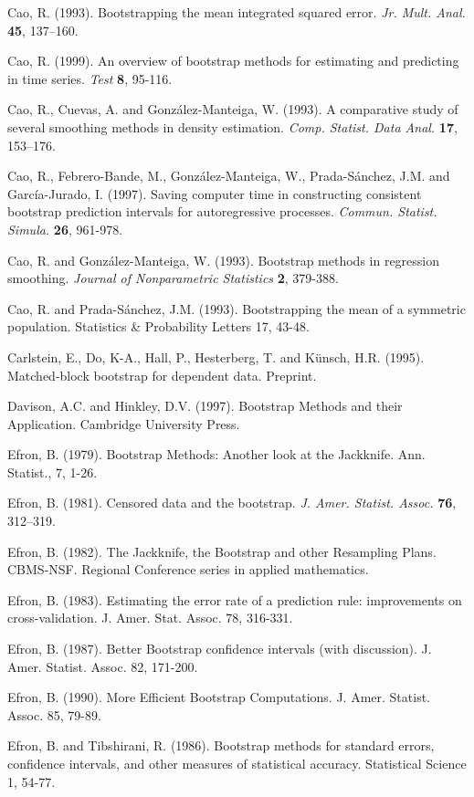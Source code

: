 \documentclass[]{book}
\theoremstyle{definition}
\theoremstyle{definition}
\theoremstyle{definition}
\theoremstyle{remark}
\begin{document}
Cao, R. (1993). Bootstrapping the mean integrated squared error.
\emph{Jr. Mult. Anal.} \textbf{45}, 137--160.

Cao, R. (1999). An overview of bootstrap methods for estimating and
predicting in time series. \emph{Test} \textbf{8}, 95-116.

Cao, R., Cuevas, A. and González-Manteiga, W. (1993). A comparative
study of several smoothing methods in density estimation. \emph{Comp.
Statist. Data Anal.} \textbf{17}, 153--176.

Cao, R., Febrero-Bande, M., González-Manteiga, W., Prada-Sánchez, J.M.
and García-Jurado, I. (1997). Saving computer time in constructing
consistent bootstrap prediction intervals for autoregressive processes.
\emph{Commun. Statist. Simula.} \textbf{26}, 961-978.

Cao, R. and González-Manteiga, W. (1993). Bootstrap methods in
regression smoothing. \emph{Journal of Nonparametric Statistics}
\textbf{2}, 379-388.

Cao, R. and Prada-Sánchez, J.M. (1993). Bootstrapping the mean of a
symmetric population. Statistics \& Probability Letters 17, 43-48.

Carlstein, E., Do, K-A., Hall, P., Hesterberg, T. and Künsch, H.R.
(1995). Matched-block bootstrap for dependent data. Preprint.

Davison, A.C. and Hinkley, D.V. (1997). Bootstrap Methods and their
Application. Cambridge University Press.

Efron, B. (1979). Bootstrap Methods: Another look at the Jackknife. Ann.
Statist., 7, 1-26.

Efron, B. (1981). Censored data and the bootstrap. \emph{J. Amer.
Statist. Assoc.} \textbf{76}, 312--319.

Efron, B. (1982). The Jackknife, the Bootstrap and other Resampling
Plans. CBMS-NSF. Regional Conference series in applied mathematics.

Efron, B. (1983). Estimating the error rate of a prediction rule:
improvements on cross-validation. J. Amer. Stat. Assoc. 78, 316-331.

Efron, B. (1987). Better Bootstrap confidence intervals (with
discussion). J. Amer. Statist. Assoc. 82, 171-200.

Efron, B. (1990). More Efficient Bootstrap Computations. J. Amer.
Statist. Assoc. 85, 79-89.

Efron, B. and Tibshirani, R. (1986). Bootstrap methods for standard
errors, confidence intervals, and other measures of statistical
accuracy. Statistical Science 1, 54-77.
\end{document}
